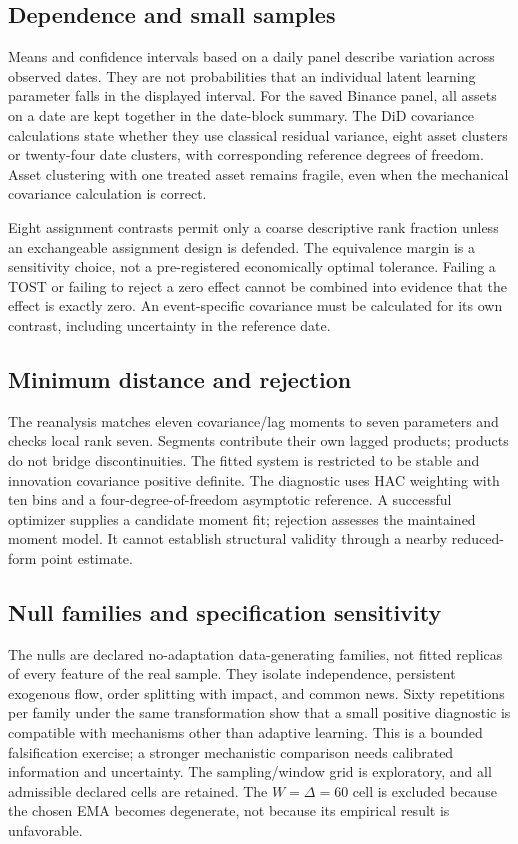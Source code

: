 \subsection{Dependence and small samples}
Means and confidence intervals based on a daily panel describe variation across observed dates. They are not probabilities that an individual latent learning parameter falls in the displayed interval. For the saved Binance panel, all assets on a date are kept together in the date-block summary. The DiD covariance calculations state whether they use classical residual variance, eight asset clusters or twenty-four date clusters, with corresponding reference degrees of freedom. Asset clustering with one treated asset remains fragile, even when the mechanical covariance calculation is correct.

Eight assignment contrasts permit only a coarse descriptive rank fraction unless an exchangeable assignment design is defended. The equivalence margin is a sensitivity choice, not a pre-registered economically optimal tolerance. Failing a TOST or failing to reject a zero effect cannot be combined into evidence that the effect is exactly zero. An event-specific covariance must be calculated for its own contrast, including uncertainty in the reference date.

\subsection{Minimum distance and rejection}
The reanalysis matches eleven covariance/lag moments to seven parameters and checks local rank seven. Segments contribute their own lagged products; products do not bridge discontinuities. The fitted system is restricted to be stable and innovation covariance positive definite. The diagnostic uses HAC weighting with ten bins and a four-degree-of-freedom asymptotic reference. A successful optimizer supplies a candidate moment fit; rejection assesses the maintained moment model. It cannot establish structural validity through a nearby reduced-form point estimate.

\subsection{Null families and specification sensitivity}
The nulls are declared no-adaptation data-generating families, not fitted replicas of every feature of the real sample. They isolate independence, persistent exogenous flow, order splitting with impact, and common news. Sixty repetitions per family under the same transformation show that a small positive diagnostic is compatible with mechanisms other than adaptive learning. This is a bounded falsification exercise; a stronger mechanistic comparison needs calibrated information and uncertainty. The sampling/window grid is exploratory, and all admissible declared cells are retained. The $W=\Delta=60$ cell is excluded because the chosen EMA becomes degenerate, not because its empirical result is unfavorable.

